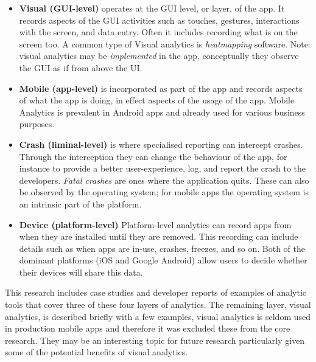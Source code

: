 \begin{itemize}
    \item \textbf{Visual (GUI-level)} operates at the GUI level, or layer, of the app. It records aspects of the GUI activities such as touches, gestures, interactions with the screen, and data entry. Often it includes recording what is on the screen too. A common type of Visual analytics is \emph{heatmapping} software. Note: visual analytics may be \emph{implemented} in the app, conceptually they observe the GUI as if from above the UI.
    \item \textbf{Mobile (app-level)} is incorporated as part of the app and records aspects of what the app is doing, in effect aspects of the usage of the app. Mobile Analytics is prevalent in Android apps and already used for various business purposes.
    \item \textbf{Crash (liminal-level)} is where specialised reporting can intercept crashes. Through the interception they can change the behaviour of the app, for instance to provide a better user-experience, log, and report the crash to the developers. \emph{Fatal crashes} are ones where the application quits. These can also be observed by the operating system; for mobile apps the operating system is an intrinsic part of the platform.
    \item \textbf{Device (platform-level)} Platform-level analytics can record apps from when they are installed until they are removed. This recording can include details such as when apps are in-use, crashes, freezes, and so on. Both of the dominant platforms (iOS and Google Android) allow users to decide whether their devices will share this data.
\end{itemize}


This research includes case studies and developer reports of examples of analytic tools that cover three of these four layers of analytics. The remaining layer, visual analytics, is described briefly with a few examples, visual analytics is seldom used in production mobile apps and therefore it was excluded these from the core research. They may be an interesting topic for future research particularly given some of the potential benefits of visual analytics. %


